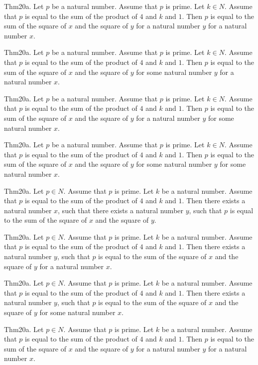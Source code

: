 \documentclass{article}
\begin{document}
Thm20a. Let $p$ be a natural number. Assume that $p$ is prime. Let $k \in N$. Assume that $p$ is equal to the sum of the product of $4$ and $k$ and $1$. Then $p$ is equal to the sum of the square of $x$ and the square of $y$ for a natural number $y$ for a natural number $x$.

Thm20a. Let $p$ be a natural number. Assume that $p$ is prime. Let $k \in N$. Assume that $p$ is equal to the sum of the product of $4$ and $k$ and $1$. Then $p$ is equal to the sum of the square of $x$ and the square of $y$ for some natural number $y$ for a natural number $x$.

Thm20a. Let $p$ be a natural number. Assume that $p$ is prime. Let $k \in N$. Assume that $p$ is equal to the sum of the product of $4$ and $k$ and $1$. Then $p$ is equal to the sum of the square of $x$ and the square of $y$ for a natural number $y$ for some natural number $x$.

Thm20a. Let $p$ be a natural number. Assume that $p$ is prime. Let $k \in N$. Assume that $p$ is equal to the sum of the product of $4$ and $k$ and $1$. Then $p$ is equal to the sum of the square of $x$ and the square of $y$ for some natural number $y$ for some natural number $x$.

Thm20a. Let $p \in N$. Assume that $p$ is prime. Let $k$ be a natural number. Assume that $p$ is equal to the sum of the product of $4$ and $k$ and $1$. Then there exists a natural number $x$, such that there exists a natural number $y$, such that $p$ is equal to the sum of the square of $x$ and the square of $y$.

Thm20a. Let $p \in N$. Assume that $p$ is prime. Let $k$ be a natural number. Assume that $p$ is equal to the sum of the product of $4$ and $k$ and $1$. Then there exists a natural number $y$, such that $p$ is equal to the sum of the square of $x$ and the square of $y$ for a natural number $x$.

Thm20a. Let $p \in N$. Assume that $p$ is prime. Let $k$ be a natural number. Assume that $p$ is equal to the sum of the product of $4$ and $k$ and $1$. Then there exists a natural number $y$, such that $p$ is equal to the sum of the square of $x$ and the square of $y$ for some natural number $x$.

Thm20a. Let $p \in N$. Assume that $p$ is prime. Let $k$ be a natural number. Assume that $p$ is equal to the sum of the product of $4$ and $k$ and $1$. Then $p$ is equal to the sum of the square of $x$ and the square of $y$ for a natural number $y$ for a natural number $x$.
\end{document}
